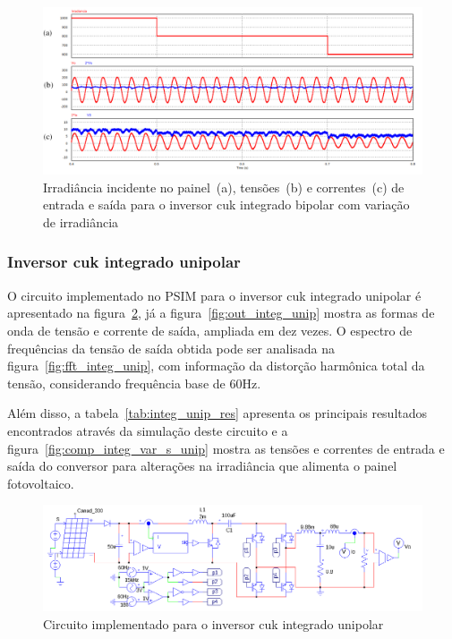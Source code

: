 \documentclass[
	12pt,				%
	openright,			%
	twoside,			%
	a4paper,			%
	english,			%
	french,				%
	spanish,			%
	brazil,				%
	]{abntex2}
\begin{document}
\begin{figure}[H]%
	\captionsetup{justification=centering}
	\centering
		\includegraphics[width= \linewidth]{comp_integ_var_s}
		\caption{Irradiância incidente no painel~(a), tensões~(b) e correntes~(c) de entrada e saída para o inversor cuk integrado bipolar com variação de irradiância}
		\label{fig:comp_integ_var_s}
\end{figure}
\subsubsection{Inversor cuk integrado unipolar}

O circuito implementado no PSIM para o inversor cuk integrado unipolar é apresentado na figura~\ref{fig:comp_integ_circ_clean_unip}, já a figura~\ref{fig:out_integ_unip} mostra as formas de onda de tensão e corrente de saída, ampliada em dez vezes. O espectro de frequências da tensão de saída obtida pode ser analisada na figura~\ref{fig:fft_integ_unip},  com informação da distorção harmônica total da tensão, considerando frequência base de 60Hz.

Além disso, a tabela~\ref{tab:integ_unip_res} apresenta os principais resultados encontrados através da simulação deste circuito e a figura~\ref{fig:comp_integ_var_s_unip} mostra as tensões e correntes de entrada e saída do conversor para alterações na irradiância que alimenta o painel fotovoltaico.

\begin{figure}[htb]%
	\captionsetup{justification=centering}
	\centering
		\includegraphics[width= \linewidth]{comp_integ_circ_clean_unip}
		\caption{Circuito implementado para o inversor cuk integrado unipolar}
		\label{fig:comp_integ_circ_clean_unip}
\end{figure}
\end{document}
